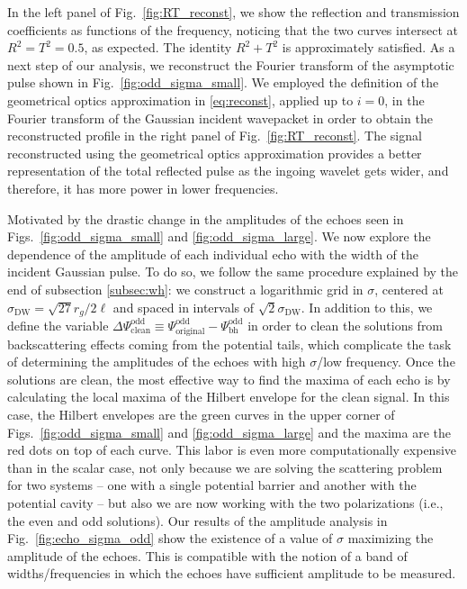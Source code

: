 \documentclass[article,aps,nofootinbib,twocolumn,superscriptaddress]{revtex4-1}
\begin{document}
In the left panel of Fig.~\ref{fig:RT_reconst}, we show the reflection and transmission coefficients as functions of the frequency, noticing that the two curves intersect at $R^2=T^2=0.5$, as expected. The identity $R^2+T^2$ is approximately satisfied. As a next step of our analysis, we reconstruct the Fourier transform of the asymptotic pulse shown in Fig.~\ref{fig:odd_sigma_small}.  We employed the definition of the geometrical optics approximation in \eqref{eq:reconst}, applied up to $i=0$, in the Fourier transform of the Gaussian incident wavepacket in order to obtain the reconstructed profile in the right panel of Fig.~\ref{fig:RT_reconst}. The signal reconstructed using the geometrical optics approximation provides a better representation of the total reflected pulse as the ingoing wavelet gets wider, and therefore, it has more power in lower frequencies. 

Motivated by the drastic change in the amplitudes of the echoes seen in Figs.~\ref{fig:odd_sigma_small} and \ref{fig:odd_sigma_large}. We now explore the dependence of the amplitude of each individual echo with the width of the incident Gaussian pulse. To do so, we follow the same procedure explained by the end of subsection \ref{subsec:wh}: we construct a logarithmic grid in $\sigma$, centered at $\sigma_{\mathrm{DW}}=\sqrt{27}r_g/2\ell$ and spaced in intervals of $\sqrt{2}\sigma_{\mathrm{DW}}$. In addition to this, we define the variable $\Delta\Psi^{\mathrm{odd}}_{\mathrm{clean}}\equiv\Psi^{\mathrm{odd}}_{\mathrm{original}}-\Psi^{\mathrm{odd}}_{\mathrm{bh}}$ in order to clean the solutions from backscattering effects coming from the potential tails, which complicate the task of determining the amplitudes of the echoes with high $\sigma$/low frequency. Once the solutions are clean, the most effective way to find the maxima of each echo is by calculating the local maxima of the Hilbert envelope for the clean signal. In this case, the Hilbert envelopes are the green curves in the upper corner of Figs.~\ref{fig:odd_sigma_small} and \ref{fig:odd_sigma_large} and the maxima are the red dots on top of each curve. 
This labor is even more computationally expensive than in the scalar case, not only because we are solving the scattering problem for two systems -- one with a single potential barrier and another with the potential cavity -- but also we are now working with the two polarizations (i.e., the even and odd solutions). Our results of the amplitude analysis in Fig.~\ref{fig:echo_sigma_odd} show the existence of a value of $\sigma$ maximizing the amplitude of the echoes. This is compatible with the notion of a band of widths/frequencies in which the echoes have sufficient amplitude to be measured.  
\end{document}
